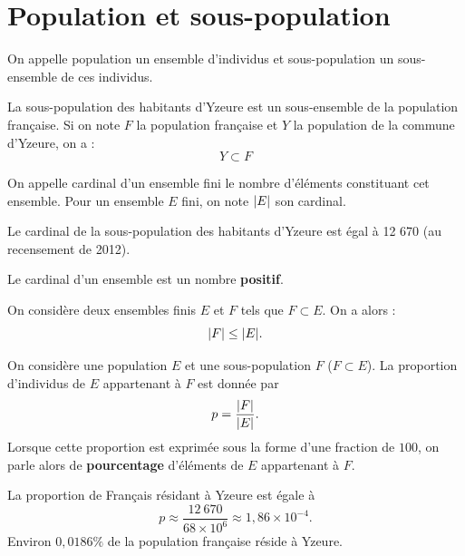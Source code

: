 \documentclass[a4paper, 12pt]{report}
\begin{document}
\section{Population et sous-population}

\begin{defn}
On appelle population un ensemble d'individus et sous-population un sous-ensemble de ces individus.
\end{defn}

\begin{ex}
La sous-population des habitants d'Yzeure est un sous-ensemble de la population française.
Si on note $F$ la population française et $Y$ la population de la commune d'Yzeure, on a :
\[ Y \subset F \]
\end{ex}

\begin{defn}[Cardinal]
On appelle cardinal d'un ensemble fini le nombre d'éléments constituant cet ensemble. 
Pour un ensemble $E$ fini, on note $\lvert E\rvert$ son cardinal.
\end{defn}

\begin{ex}
Le cardinal de la sous-population des habitants d'Yzeure est égal à 12 670 (au recensement de 2012).
\end{ex}

\begin{rmq}
Le cardinal d'un ensemble est un nombre \textbf{positif}.
\end{rmq}

\begin{prop}
On considère deux ensembles finis $E$ et $F$ tels que $F \subset E$. On a alors :
\[ \lvert F\rvert \leq \lvert E\rvert . \]
\end{prop}

\begin{defn}
On considère une population $E$ et une sous-population $F$ ($F \subset E$).
La proportion d'individus de $E$ appartenant à $F$ est donnée par
\[ p = \dfrac{\lvert F\rvert}{\lvert E\rvert}. \]
Lorsque cette proportion est exprimée sous la forme d'une fraction de $100$, on parle alors de \textbf{pourcentage} d'éléments de $E$ appartenant à $F$.
\end{defn}

\begin{ex}
La proportion de Français résidant à Yzeure est égale à 
\[ p \approx \dfrac{12~670}{68 \times 10^6} \approx 1,86 \times 10^{-4} . \] 
Environ $0,0186 \%$ de la population française réside à Yzeure. 
\end{ex}
\end{document}
